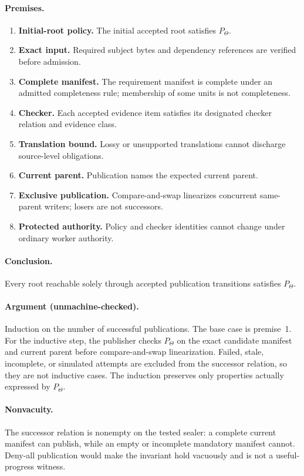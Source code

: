 \paragraph{Premises.}
\begin{enumerate}
\item \textbf{Initial-root policy.} The initial accepted root satisfies $P_{\Theta}$.
\item \textbf{Exact input.} Required subject bytes and dependency references are
verified before admission.
\item \textbf{Complete manifest.} The requirement manifest is complete under an
admitted completeness rule; membership of some units is not completeness.
\item \textbf{Checker.} Each accepted evidence item satisfies its designated
checker relation and evidence class.
\item \textbf{Translation bound.} Lossy or unsupported translations cannot
discharge source-level obligations.
\item \textbf{Current parent.} Publication names the expected current parent.
\item \textbf{Exclusive publication.} Compare-and-swap linearizes concurrent
same-parent writers; losers are not successors.
\item \textbf{Protected authority.} Policy and checker identities cannot change
under ordinary worker authority.
\end{enumerate}

\paragraph{Conclusion.}
Every root reachable solely through accepted publication transitions satisfies
$P_{\Theta}$.

\paragraph{Argument (unmachine-checked).}
Induction on the number of successful publications. The base case is premise~1.
For the inductive step, the publisher checks $P_{\Theta}$ on the exact candidate
manifest and current parent before compare-and-swap linearization. Failed,
stale, incomplete, or simulated attempts are excluded from the successor
relation, so they are not inductive cases. The induction preserves only
properties actually expressed by $P_{\Theta}$.

\paragraph{Nonvacuity.}
The successor relation is nonempty on the tested sealer: a complete current
manifest can publish, while an empty or incomplete mandatory manifest cannot.
Deny-all publication would make the invariant hold vacuously and is not a
useful-progress witness.

